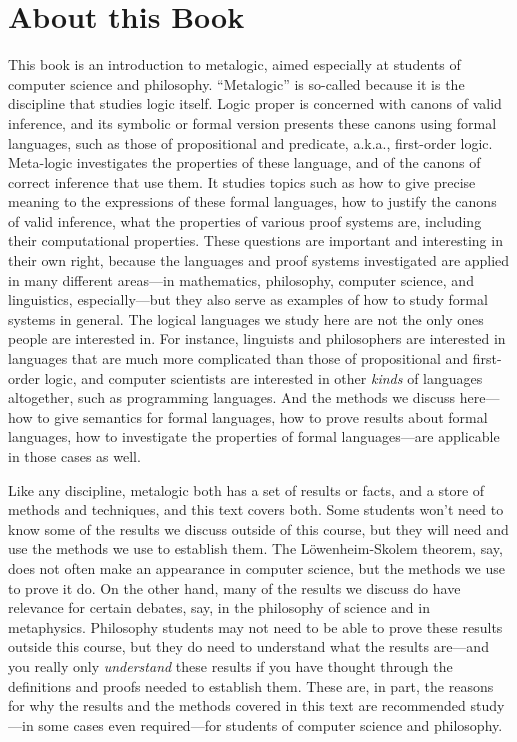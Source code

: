 
\chapter{About this Book}

This book is an introduction to metalogic, aimed especially at
students of computer science and philosophy. ``Metalogic'' is
so-called because it is the discipline that studies logic itself.
Logic proper is concerned with canons of valid inference, and its
symbolic or formal version presents these canons using formal
languages, such as those of propositional and predicate, a.k.a.,
first-order logic. Meta-logic investigates the properties of these
language, and of the canons of correct inference that use them. It
studies topics such as how to give precise meaning to the expressions
of these formal languages, how to justify the canons of valid
inference, what the properties of various proof systems are, including
their computational properties. These questions are important and
interesting in their own right, because the languages and proof
systems investigated are applied in many different areas---in
mathematics, philosophy, computer science, and linguistics,
especially---but they also serve as examples of how to study formal
systems in general. The logical languages we study here are not the
only ones people are interested in. For instance, linguists and
philosophers are interested in languages that are much more
complicated than those of propositional and first-order logic, and
computer scientists are interested in other \emph{kinds} of languages
altogether, such as programming languages. And the methods we discuss
here---how to give semantics for formal languages, how to prove
results about formal languages, how to investigate the properties of
formal languages---are applicable in those cases as well.

Like any discipline, metalogic both has a set of results or facts,
and a store of methods and techniques, and this text covers both.
Some students won't need to know some of the results we discuss
outside of this course, but they will need and use the methods we use
to establish them. The L\"owenheim-Skolem theorem, say, does not
often make an appearance in computer science, but the methods we use
to prove it do. On the other hand, many of the results we discuss do
have relevance for certain debates, say, in the philosophy of science
and in metaphysics. Philosophy students may not need to be able to
prove these results outside this course, but they do need to
understand what the results are---and you really only
\emph{understand} these results if you have thought through the
definitions and proofs needed to establish them. These are, in part,
the reasons for why the results and the methods covered in this text
are recommended study---in some cases even required---for students of
computer science and philosophy.

